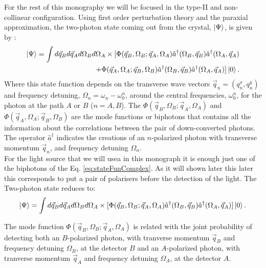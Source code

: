For the rest of this monography we will be focused in the type-II and non-collinear configuration. Using first order perturbation theory  and the paraxial approximation, the two-photon state
 coming out from the crystal, $\ket{\Psi}$, is given by \cite{omar}:
\begin{equation}
\begin{split}
\label{eq:stateFunComplex}
\ket{\Psi}=\int d\vec{q}_B d\vec{q}_A d\Omega_B d\Omega_A 
\times [\Phi(\vec{q}_B,\Omega_B;\vec{q}_A,\Omega_A) \hat{a}^{\dagger} (\Omega_B,\vec{q}_B) \hat{a}^{\dagger}(\Omega_A,\vec{q}_A) \\
+ \Phi(\vec{q}_A,\Omega_A;\vec{q}_B,\Omega_B) \hat{a}^{\dagger}(\Omega_B,\vec{q}_B) \hat{a}^{\dagger}(\Omega_A,\vec{q}_A)]   \ket{0}.  
\end{split}
\end{equation}
Where this state function depends on the transverse wave vectors $\vec{q}_n=(q_n^x,q_n^y)$ and frequency detuning, $\Omega_n=\omega_n-\omega_0^n$, 
around the central frequencies, $\omega_0^n$, for the photon at the path $A$ or $B$ ($n=A,B$).
The $\Phi(\vec{q}_B,\Omega_B;\vec{q}_A,\Omega_A)$ and $\Phi(\vec{q}_A,\Omega_A;\vec{q}_B,\Omega_B)$
are the mode functions or biphotons that contains all the information about the correlations
between the pair of down-converted photons. The operator $\hat{a}^{\dagger}$ indicates the creations of an $n$-polarized photon with transverse momentum $\vec{q}_n$, 
and frequency detuning $\Omega_n$. \\

For the light source that we will usea in this monograph it is enough just one of the biphotons of the Eq. \ref{eq:stateFunComplex}. 
As it will shown later this later this corresponds to put a pair of polarisers before the detection of the light. The Two-photon state reduces to:
\begin{equation}
\label{eq:stateFun}
\ket{\Psi}=\int d\vec{q}_B d\vec{q}_A d\Omega_B d\Omega_A 
\times [\Phi(\vec{q}_B,\Omega_B;\vec{q}_A,\Omega_A) \hat{a}^{\dagger} (\Omega_B,\vec{q}_B) \hat{a}^{\dagger}(\Omega_A,\vec{q}_A) 
] \ket{0}.  
\end{equation}

The mode function  $\Phi(\vec{q}_B,\Omega_B;\vec{q}_A,\Omega_A)$ is related with the joint probability of detecting both an $B$-polarized
photon, with tranverse momentum $\vec{q}_B$ and frequency detuning $\Omega_B$, at the detector $B$ 
and an $A$-polarized
photon, with tranverse momentum $\vec{q}_A$ and frequency detuning $\Omega_A$, at the detector $A$. 

